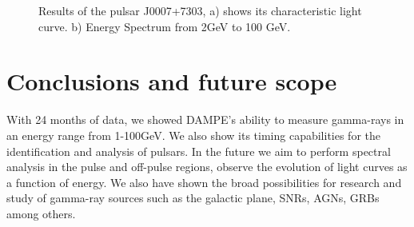 \documentclass{PoS}
\begin{document}
\begin{figure}
\centering
{}
\caption{Results of the pulsar J0007+7303, a)  shows its characteristic  light curve. b) Energy Spectrum from 2GeV to 100 GeV.}
\label{j0007}
\end{figure}




\section{Conclusions and future scope}
With 24 months of  data, we showed DAMPE's ability to measure gamma-rays in an energy range from 1-100GeV.
We also show its timing capabilities for the identification and analysis of pulsars.
In the future we aim to perform spectral analysis in the pulse and off-pulse regions, observe the evolution of light curves  as a function of energy. 
We also have shown the broad possibilities for research and study of gamma-ray sources such as the galactic plane, SNRs, AGNs, GRBs among others.
\end{document}
